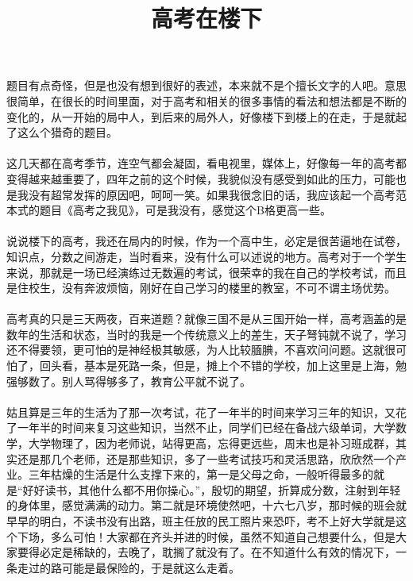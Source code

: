 \documentclass[UTF8]{ctexart}
\title{高考在楼下}
\begin{document}
 

\maketitle

          \section{}
          \paragraph{}题目有点奇怪，但是也没有想到很好的表述，本来就不是个擅长文字的人吧。意思很简单，在很长的时间里面，对于高考和相关的很多事情的看法和想法都是不断的变化的，从一开始的局中人，到后来的局外人，好像楼下到楼上的在走，于是就起了这么个猎奇的题目。
          \paragraph{}这几天都在高考季节，连空气都会凝固，看电视里，媒体上，好像每一年的高考都变得越来越重要了，四年之前的这个时候，我貌似没有感受到如此的压力，可能也是我没有超常发挥的原因吧，呵呵一笑。如果我很念旧的话，我应该起一个高考范本式的题目《高考之我见》，可是我没有，感觉这个B格更高一些。
          \paragraph{}说说楼下的高考，我还在局内的时候，作为一个高中生，必定是很苦逼地在试卷，知识点，分数之间游走，当时看来，没有什么可以述说的地方。高考对于一个学生来说，那就是一场已经演练过无数遍的考试，很荣幸的我在自己的学校考试，而且是住校生，没有奔波烦恼，刚好在自己学习的楼里的教室，不可不谓主场优势。
          \paragraph{}高考真的只是三天两夜，百来道题？就像三国不是从三国开始一样，高考涵盖的是数年的生活和状态，当时的我是一个传统意义上的差生，天子弩钝就不说了，学习还不得要领，更可怕的是神经极其敏感，为人比较腼腆，不喜欢问问题。这就很可怕了，回头看，基本是死路一条，但是，摊上个不错的学校，加上这里是上海，勉强够数了。别人骂得够多了，教育公平就不说了。
          \paragraph{}姑且算是三年的生活为了那一次考试，花了一年半的时间来学习三年的知识，又花了一年半的时间来复习这些知识，当然不止，同学们已经在备战六级单词，大学数学，大学物理了，因为老师说，站得更高，忘得更远些，周末也是补习班成群，其实还是那几个老师，还是那些知识，多了一些考试技巧和灵活思路，欣欣然一个产业。三年枯燥的生活是什么支撑下来的，第一是父母之命，一般听得最多的就是“好好读书，其他什么都不用你操心。”，殷切的期望，折算成分数，注射到年轻的身体里，感觉满满的动力。第二就是环境使然吧，十六七八岁，那时候的班会就早早的明白，不读书没有出路，班主任放的民工照片来恐吓，考不上好大学就是这个下场，多么可怕！大家都在齐头并进的时候，虽然不知道自己想要什么，但是大家要得必定是稀缺的，去晚了，耽搁了就没有了。在不知道什么有效的情况下，一条走过的路可能是最保险的，于是就这么走着。
\end{document}
